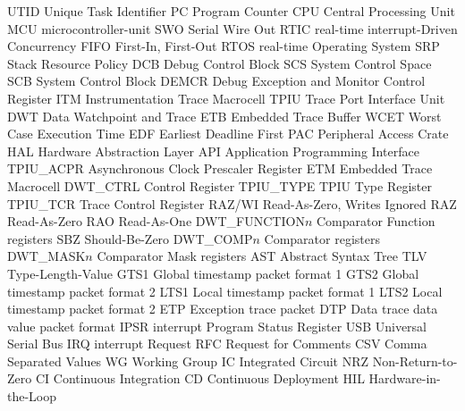  {UTID} {{Unique Task Identifier}}
 {PC} {{Program Counter}}
 {CPU} {{Central Processing Unit}}
 {MCU} {{\Gls{microcontroller-unit}}}
 {SWO} {{Serial Wire Out}}
 {RTIC} {{\Gls{real-time} \Gls{interrupt}-Driven Concurrency}}
 {FIFO} {{First-In, First-Out}}
 {RTOS} {{\Gls{real-time} Operating System}}
 {SRP} {{Stack Resource Policy}}
 {DCB} {{Debug Control Block}}
 {SCS} {{System Control Space}}
 {SCB} {{System Control Block}}
 {DEMCR} {{Debug Exception and Monitor Control Register}}
 {ITM} {{Instrumentation Trace Macrocell}}
 {TPIU} {{Trace Port Interface Unit}}
 {DWT} {{Data Watchpoint and Trace}}
 {ETB} {{Embedded Trace Buffer}}
 {WCET} {{Worst Case Execution Time}}
 {EDF} {{Earliest Deadline First}}
 {PAC} {{Peripheral Access Crate}}
 {HAL} {{Hardware Abstraction Layer}}
 {API} {{Application Programming Interface}}
 {TPIU\_ACPR} {{Asynchronous Clock Prescaler Register}}
 {ETM} {{Embedded Trace Macrocell}}
 {DWT\_CTRL} {{Control Register}}
 {TPIU\_TYPE} {{TPIU Type Register}}
 {TPIU\_TCR} {{Trace Control Register}}
 {RAZ/WI} {{Read-As-Zero, Writes Ignored}}
 {RAZ} {{Read-As-Zero}}
 {RAO} {{Read-As-One}}
 {DWT\_FUNCTION$n$} {{Comparator Function registers}}
 {SBZ} {{Should-Be-Zero}}
 {DWT\_COMP$n$} {{Comparator registers}}
 {DWT\_MASK$n$} {{Comparator Mask registers}}
 {AST} {{Abstract Syntax Tree}}
 {TLV} {{Type-Length-Value}}
 {GTS1} {{Global timestamp packet format 1}}
 {GTS2} {{Global timestamp packet format 2}}
 {LTS1} {{Local timestamp packet format 1}}
 {LTS2} {{Local timestamp packet format 2}}
 {ETP} {{Exception trace packet}}
 {DTP} {{Data trace data value packet format}}
 {IPSR} {{\Gls{interrupt} Program Status Register}}
 {USB} {{Universal Serial Bus}}
 {IRQ} {{\Gls{interrupt} Request}}
 {RFC} {{Request for Comments}}
 {CSV} {{Comma Separated Values}}
 {WG} {{Working Group}}
 {IC} {{Integrated Circuit}}
 {NRZ} {{Non-Return-to-Zero}}
 {CI} {{Continuous Integration}}
 {CD} {{Continuous Deployment}}
 {HIL} {{Hardware-in-the-Loop}}



